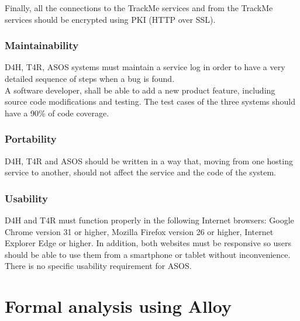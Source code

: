 \documentclass[hidelinks, 12pt]{report}
\begin{document}
	Finally, all the connections to the TrackMe services and from the TrackMe services should be encrypted using PKI (HTTP over SSL).
	
	\subsection{Maintainability}
	D4H, T4R, ASOS systems must maintain a service log in order to have a very detailed sequence of steps when a bug is found.\\
	
	A software developer, shall be able to add a new product feature, including source code modifications and testing. The test cases of the three systems should have a 90\% of code coverage.\\
	
	\subsection{Portability}
	D4H, T4R and ASOS should be written in a way that, moving from one hosting service to another, should not affect the service and the code of the system.
	
	\subsection{Usability}
	D4H and T4R must function properly in the following Internet browsers: Google Chrome version 31 or higher, Mozilla Firefox version 26 or higher, Internet Explorer Edge or higher. In addition, both websites must be responsive so users should be able to use them from a smartphone or tablet without inconvenience.\\
	
	There is no specific usability requirement for ASOS.
	
	\chapter{Formal analysis using Alloy}
	
\end{document}
